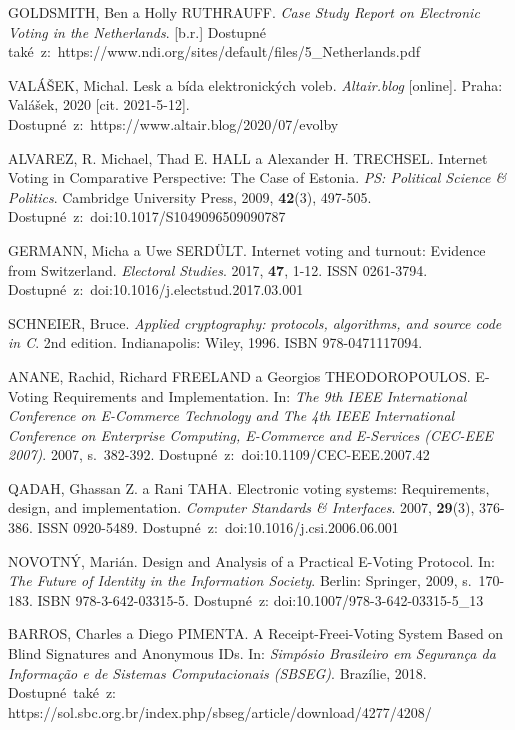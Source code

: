 
GOLDSMITH, Ben a Holly RUTHRAUFF. \textit{Case Study Report on Electronic Voting in the Netherlands}. [b.r.]
Dostupné také~z:~https://www.ndi.org/sites/default/files/5{\_}Netherlands.pdf

VALÁŠEK, Michal. Lesk a bída elektronických voleb. \textit{Altair.blog} [online]. Praha: Valášek, 2020 [cit. 2021-5-12]. Dostupné~z:~https://www.altair.blog/2020/07/evolby

ALVAREZ, R. Michael, Thad E. HALL a Alexander H. TRECHSEL. Internet Voting in Comparative Perspective: The Case of Estonia. \textit{PS: Political Science \& Politics}. Cambridge University Press, 2009, \textbf{42}(3), 497-505. Dostupné~z:~doi:10.1017/S1049096509090787

GERMANN, Micha a Uwe SERDÜLT. Internet voting and turnout: Evidence from Switzerland. \textit{Electoral Studies}. 2017, \textbf{47}, 1-12. ISSN 0261-3794. Dostupné~z:~doi:10.1016/j.electstud.2017.03.001

SCHNEIER, Bruce. \textit{Applied cryptography: protocols, algorithms, and source code in C}. 2nd edition. Indianapolis: Wiley, 1996. ISBN 978-0471117094.

ANANE, Rachid, Richard FREELAND a Georgios THEODOROPOULOS. E-Voting Requirements and Implementation. In: \textit{The 9th IEEE International Conference on E-Commerce Technology and The 4th IEEE International Conference on Enterprise Computing, E-Commerce and E-Services (CEC-EEE 2007)}. 2007, s.~382-392. Dostupné~z:~doi:10.1109/CEC-EEE.2007.42

QADAH, Ghassan Z. a Rani TAHA. Electronic voting systems: Requirements, design, and implementation. \textit{Computer Standards \& Interfaces}. 2007, \textbf{29}(3), 376-386. ISSN 0920-5489. Dostupné~z:~doi:10.1016/j.csi.2006.06.001

NOVOTNÝ, Marián. Design and Analysis of a Practical E-Voting Protocol. In: \textit{The Future of Identity in the Information Society}. Berlin: Springer, 2009, s.~170-183. ISBN 978-3-642-03315-5. Dostupné~z: doi:10.1007/978-3-642-03315-5\_13

BARROS, Charles a Diego PIMENTA. A Receipt-Freei-Voting System Based on Blind Signatures and Anonymous IDs. In: \textit{Simpósio Brasileiro em Segurança da Informação e de Sistemas Computacionais (SBSEG)}. Brazílie, 2018. Dostupné~také~z: https://sol.sbc.org.br/index.php/sbseg/article/download/4277/4208/

